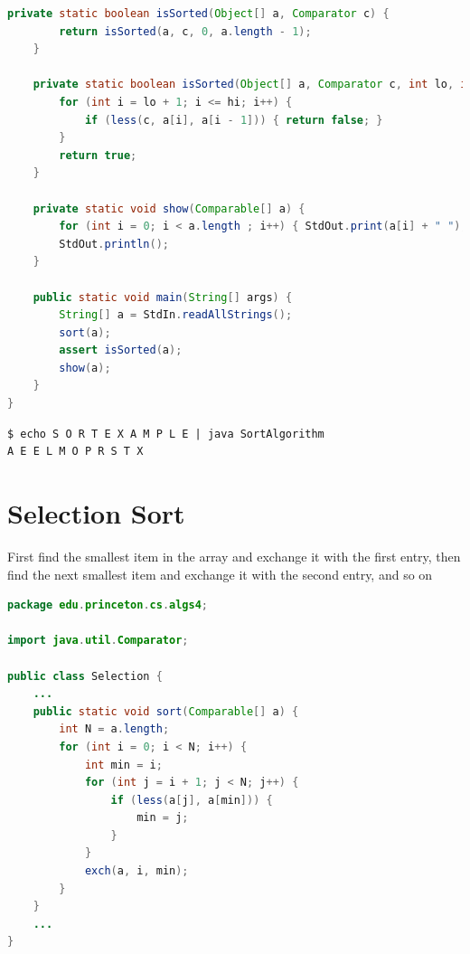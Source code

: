 \documentclass[8pt,a4paper,compress]{beamer}
\begin{document}
\begin{frame}[fragile]
\begin{lstlisting}[language=Java]
    private static boolean isSorted(Object[] a, Comparator c) {
        return isSorted(a, c, 0, a.length - 1);
    }

    private static boolean isSorted(Object[] a, Comparator c, int lo, int hi) {
        for (int i = lo + 1; i <= hi; i++) {
            if (less(c, a[i], a[i - 1])) { return false; }
        }
        return true;
    }
    
    private static void show(Comparable[] a) {
        for (int i = 0; i < a.length ; i++) { StdOut.print(a[i] + " "); }
        StdOut.println();
    }
    
    public static void main(String[] args) {
        String[] a = StdIn.readAllStrings();
        sort(a);
        assert isSorted(a);
        show(a);
    }
}
\end{lstlisting}

\begin{lstlisting}[language={}]
$ echo S O R T E X A M P L E | java SortAlgorithm
A E E L M O P R S T X
\end{lstlisting}
\end{frame}

\section{Selection Sort}
\begin{frame}[fragile]
First find the smallest item in the array and exchange it with the first entry, then find the next smallest item and exchange it with the second entry, and so on

\bigskip

\begin{lstlisting}[language=Java]
package edu.princeton.cs.algs4;

import java.util.Comparator;

public class Selection {
    ...
    public static void sort(Comparable[] a) {
        int N = a.length;
        for (int i = 0; i < N; i++) {
            int min = i;
            for (int j = i + 1; j < N; j++) {
                if (less(a[j], a[min])) { 
                    min = j;
                }
            }
            exch(a, i, min);
        }
    }
    ...
}
\end{lstlisting}
\end{frame}
\end{document}
